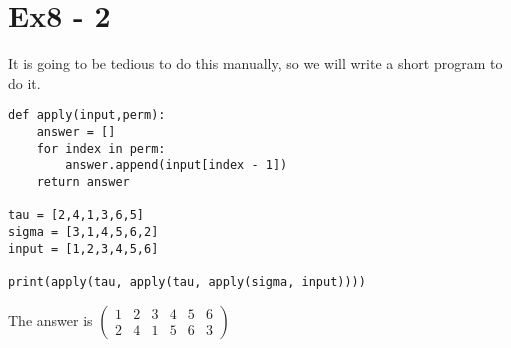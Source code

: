 \section*{Ex8 - 2}
It is going to be tedious to do this manually, so we will write a short program to do it.

\begin{verbatim}
def apply(input,perm):
    answer = []
    for index in perm:
        answer.append(input[index - 1])
    return answer

tau = [2,4,1,3,6,5]
sigma = [3,1,4,5,6,2]
input = [1,2,3,4,5,6]

print(apply(tau, apply(tau, apply(sigma, input))))
\end{verbatim}

The answer is $ \left(\begin{array}{cccccc}1 & 2 & 3 & 4 & 5 & 6\\2 & 4 & 1 & 5 & 6 & 3\end{array}\right) $
